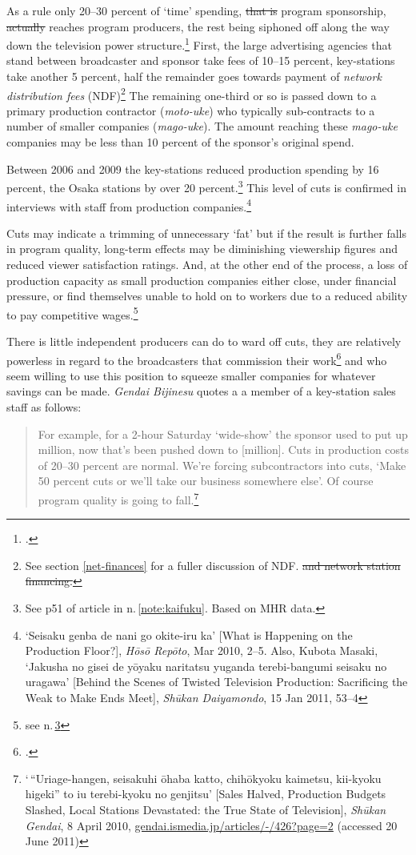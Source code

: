 \documentclass[11pt, oneside, a4paper, headsepline]{scrartcl}
\newcommand{\citej}[2] {\footcite[\nopp #1]{#2} }
\newcommand{\ty}{\textyen}
\newcommand{\hrpt}{\textit{H\={o}s\={o} Rep\={o}to}}
\begin{document}
\bigskip	

As a rule only 20--30 percent of `time' spending, \st{that is }program sponsorship, \st{actually} reaches program producers, the rest being siphoned off along the way down the television power structure.\citej{60}{Nishi:2007} First, the large advertising agencies that stand between broadcaster and sponsor take fees of 10--15 percent, key-stations take another 5 percent, half the remainder goes towards payment of \emph{network distribution fees} (NDF)\footnote{See section \ref{net-finances} for a fuller discussion of NDF.\st{ and network station financing.}} The remaining one-third or so is passed down to a primary production contractor (\emph{moto-uke}) who typically sub-contracts to a number of smaller companies (\emph{mago-uke}). The amount reaching these \emph{mago-uke} companies may be less than 10 percent of the sponsor's original spend.

Between 2006 and 2009 the key-stations reduced production spending by 16 percent, the Osaka stations by over 20 percent.\footnote{See p51 of article in n.\,\ref{note:kaifuku}. Based on MHR data.} This level of cuts is confirmed in interviews with staff from production companies.\footnote{`Seisaku genba de nani go okite-iru ka' [What is Happening on the Production Floor?], \hrpt, Mar 2010, 2--5. Also, Kubota Masaki, `Jakusha no gisei de y\={o}yaku naritatsu yuganda terebi-bangumi seisaku no uragawa' [Behind the Scenes of Twisted Television Production: Sacrificing the Weak to Make Ends Meet], \emph{Sh\={u}kan Daiyamondo}, 15 Jan 2011, 53--4\label{note:jakusha}} 

Cuts may indicate a trimming of unnecessary `fat' but if the result is further falls in program quality, long-term effects may be diminishing viewership figures and reduced viewer satisfaction ratings. And, at the other end of the process, a loss of production capacity as small production companies either close, under financial pressure, or find themselves unable to hold on to workers due to a reduced ability to pay competitive wages.\footnote{see n.\,\ref{note:jakusha}} 

There is little independent producers can do to ward off cuts, they are relatively powerless in regard to the broadcasters that commission their work\citej{112}{Nakano:2008} and who seem willing to use this position to squeeze smaller companies for whatever savings can be made. \textit{Gendai Bijinesu} quotes a a member of a key-station sales staff as follows: 
\begin{quote}
For example, for a 2-hour Saturday `wide-show' the sponsor used to put up \ty35 million, now that's been pushed down to \ty26[million]. Cuts in production costs of 20--30 percent are normal. We're forcing subcontractors into cuts, `Make 50 percent cuts or we'll take our business somewhere else'. Of course program quality is going to fall.\footnote{`\,``Uriage-hangen, seisakuhi \={o}haba katto, chih\={o}kyoku kaimetsu, kii-kyoku higeki'' to iu terebi-kyoku no genjitsu' [Sales Halved, Production Budgets Slashed, Local Stations Devastated: the True State of Television], \emph{Sh\={u}kan Gendai}, 8 April 2010, \url{gendai.ismedia.jp/articles/-/426?page=2}\label{note:kaimetsu}  (accessed 20 June 2011)}
\end{quote}
\end{document}
